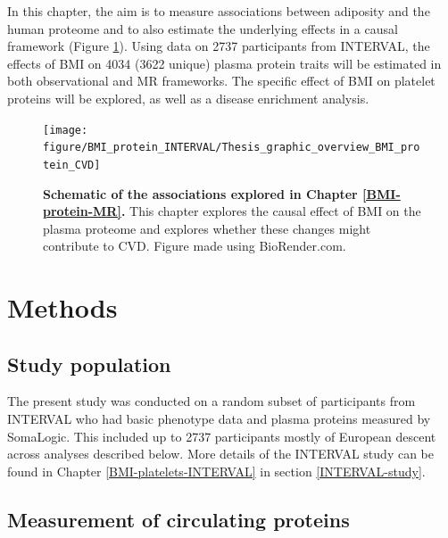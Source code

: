 \documentclass[11pt,twoside]{bristolthesis}
\begin{document}
In this chapter, the aim is to measure associations between adiposity and the human proteome and to also estimate the underlying effects in a causal framework (Figure \ref{fig:BMI-protein-graphic-INT}). Using data on 2737 participants from INTERVAL, the effects of BMI on 4034 (3622 unique) plasma protein traits will be estimated in both observational and MR frameworks. The specific effect of BMI on platelet proteins will be explored, as well as a disease enrichment analysis.



\begin{figure}

{\centering \texttt{[image: figure/BMI\_protein\_INTERVAL/Thesis\_graphic\_overview\_BMI\_protein\_CVD]} 

}

\caption[Schematic of the associations explored in /\textsuperscript{\protect\hyperlink{ref-ref}{\textbf{ref?}}}(BMI-protein-MR).]{\textbf{Schematic of the associations explored in Chapter \ref{BMI-protein-MR}.} This chapter explores the causal effect of BMI on the plasma proteome and explores whether these changes might contribute to CVD. Figure made using BioRender.com.}\label{fig:BMI-protein-graphic-INT}
\end{figure}
\hypertarget{methods-2}{%
\section{Methods}\label{methods-2}}

\hypertarget{study-population-2}{%
\subsection{Study population}\label{study-population-2}}

The present study was conducted on a random subset of participants from INTERVAL who had basic phenotype data and plasma proteins measured by SomaLogic. This included up to 2737 participants mostly of European descent across analyses described below. More details of the INTERVAL study can be found in Chapter \ref{BMI-platelets-INTERVAL} in section \ref{INTERVAL-study}.

\hypertarget{measurement-of-circulating-proteins}{%
\subsection{Measurement of circulating proteins}\label{measurement-of-circulating-proteins}}
\end{document}
